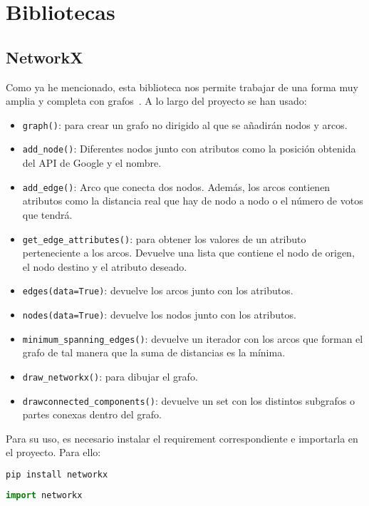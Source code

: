 \section{Bibliotecas}

\subsection{NetworkX}\label{networkx}
Como ya he mencionado, esta biblioteca nos permite trabajar de una forma muy amplia y completa con grafos~\cite{doc:networkx}. A lo largo del proyecto se han usado:
\begin{itemize}
	\item \texttt{graph()}: para crear un grafo no dirigido al que se añadirán nodos y arcos.
	\item \texttt{add\_node()}: Diferentes nodos junto con atributos como la posición obtenida del API de Google y el nombre.
	\item \texttt{add\_edge()}: Arco que conecta dos nodos. Además, los arcos contienen atributos como la distancia real que hay de nodo a nodo o el número de votos que tendrá.
	\item \texttt{get\_edge\_attributes()}: para obtener los valores de un atributo perteneciente a los arcos. Devuelve una lista que contiene el nodo de origen, el nodo destino y el atributo deseado.
	\item \texttt{edges(data=True)}: devuelve los arcos junto con los atributos.
	\item \texttt{nodes(data=True)}: devuelve los nodos junto con los atributos.
	\item \texttt{minimum\_spanning\_edges()}: devuelve un iterador con los arcos que forman el grafo de tal manera que la suma de distancias es la mínima.
	\item \texttt{draw\_networkx()}: para dibujar el grafo.
	\item \texttt{drawconnected\_components()}: devuelve un set con los distintos subgrafos o partes conexas dentro del grafo.
\end{itemize}

Para su uso, es necesario instalar el requirement correspondiente e importarla en el proyecto. Para ello:
\renewcommand{\lstlistingname}{NetworkX}
\renewcommand{\lstlistlistingname}{List of \lstlistingname s}
\begin{lstlisting}[language=python,caption={Instalación mediante pip.}]
pip install networkx
\end{lstlisting}
\begin{lstlisting}[language=python,caption={Importación.}]
import networkx
\end{lstlisting}


